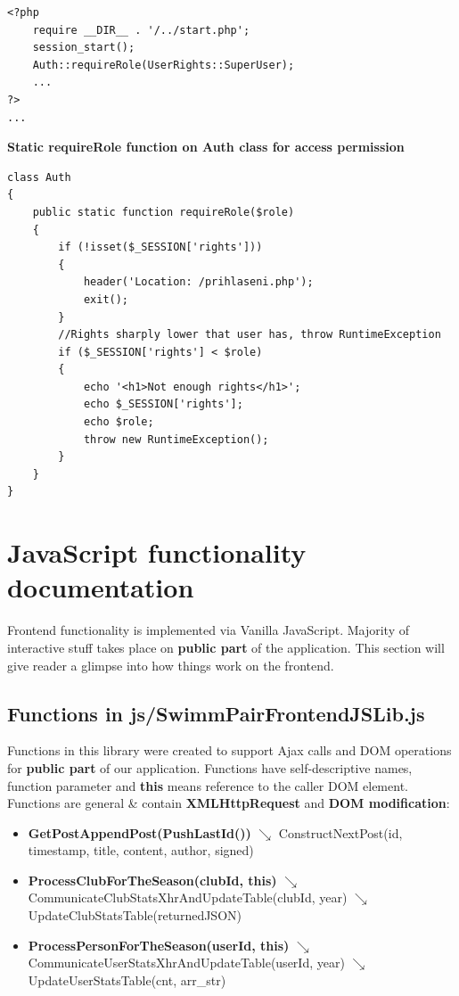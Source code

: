 \begin {lstlisting}
<?php
    require __DIR__ . '/../start.php';
    session_start();
    Auth::requireRole(UserRights::SuperUser);
    ...
?>    
...
\end{lstlisting}
\textbf{Static requireRole function on Auth class for access permission} 
\begin{lstlisting}
class Auth
{
	public static function requireRole($role)
	{
		if (!isset($_SESSION['rights']))
        {
			header('Location: /prihlaseni.php');
			exit();
		}
		//Rights sharply lower that user has, throw RuntimeException
		if ($_SESSION['rights'] < $role)
        {
			echo '<h1>Not enough rights</h1>';
			echo $_SESSION['rights'];
			echo $role;
			throw new RuntimeException();
		}
	}
}
\end{lstlisting}
\section{JavaScript functionality documentation}
Frontend functionality is implemented via Vanilla JavaScript. Majority of interactive stuff takes place on \textbf{public part} of the application. This section will give reader a glimpse into how things work on the frontend.
\subsection*{Functions in js/SwimmPairFrontendJSLib.js}
Functions in this library were created to support Ajax calls and DOM operations for \textbf{public part} of our application. Functions have self-descriptive names, function parameter and \textbf{this} means reference to the caller DOM element.  
\newline
Functions are general \& contain \textbf{XMLHttpRequest} and \textbf{DOM modification}:
\begin{itemize}
  \setlength\itemsep{0em}
  \item \textbf{GetPostAppendPost(PushLastId())}
  \newline    $\searrow$ ConstructNextPost(id, timestamp, title, content, author, signed)
  \item \textbf{ProcessClubForTheSeason(clubId, this)}
  \newline    $\searrow$ CommunicateClubStatsXhrAndUpdateTable(clubId, year)
  \newline    $\searrow$ UpdateClubStatsTable(returnedJSON)
  \item \textbf{ProcessPersonForTheSeason(userId, this)}
  \newline    $\searrow$ CommunicateUserStatsXhrAndUpdateTable(userId, year)
  \newline    $\searrow$ UpdateUserStatsTable(cnt, arr\_str)
\end{itemize}

